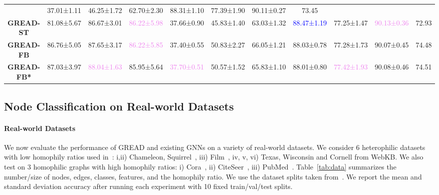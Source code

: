 \documentclass{article}
\theoremstyle{plain}
\theoremstyle{definition}
\theoremstyle{remark}
\newcommand{\std}{\scriptsize{}}
\newcommand{\SECOND}[1]{\textcolor{blue}{#1}}
\newcommand{\THIRD}[1]{\textcolor{violet}{#1}}
\begin{document}
\begin{table*}[ht]
\begin{tabular}{c ccccccccc c}
                    & 37.01\std{±1.11} & 46.25\std{±1.72} & 62.70\std{±2.30} 
                    & 88.31\std{±1.10} & 77.39\std{±1.90} & 90.11\std{±0.27} & 73.45\\
        \textbf{GREAD-ST} 
                        & 81.08\std{±5.67} & 86.67\std{±3.01} & \THIRD{86.22\std{±5.98}}
                        & 37.66\std{±0.90} & 45.83\std{±1.40} & 63.03\std{±1.32} 
                        & \SECOND{88.47\std{±1.19}} & 77.25\std{±1.47} & \THIRD{90.13\std{±0.36}} & 72.93\\
        \textbf{GREAD-FB}   
                        & 86.76\std{±5.05} & 87.65\std{±3.17} & \THIRD{86.22\std{±5.85}} 
                        & 37.40\std{±0.55} & 50.83\std{±2.27} & 66.05\std{±1.21} 
                        & 88.03\std{±0.78} & 77.28\std{±1.73} & 90.07\std{±0.45} & 74.48\\
        \textbf{GREAD-FB*}   
                        & 87.03\std{±3.97} & \THIRD{88.04\std{±1.63}} & 85.95\std{±5.64} 
                        & \THIRD{37.70\std{±0.51}} & 50.57\std{±1.52} & 65.83\std{±1.10} 
                        & 88.01\std{±0.80} & \THIRD{77.42\std{±1.93}} &  90.08\std{±0.46} & 74.51\\
        \bottomrule
    \end{tabular}
    \label{tab:result}
\end{table*}


\subsection{Node Classification on Real-world Datasets}
\paragraph{Real-world Datasets}
We now evaluate the performance of GREAD and existing GNNs on a variety of real-world datasets. We consider 6 heterophilic datasets with low homophily ratios used in~\cite{pei2020geomGCN}: i,ii) Chameleon, Squirrel~\cite{benedek2021musae}, iii) Film~\cite{tang2009social}, iv, v, vi) Texas, Wisconsin and Cornell from WebKB. We also test on 3 homophilic graphs with high homophily ratios: i) Cora~\cite{mccallum2000automating}, ii) CiteSeer~\cite{sen2008collective}, iii) PubMed~\cite{yang2016revisiting}. Table~\ref{tab:data} summarizes the number/size of nodes, edges, classes, features, and the homophily ratio. We use the dataset splits taken from~\cite{pei2020geomGCN}. We report the mean and standard deviation accuracy after running each experiment with 10 fixed train/val/test splits.
\end{document}
